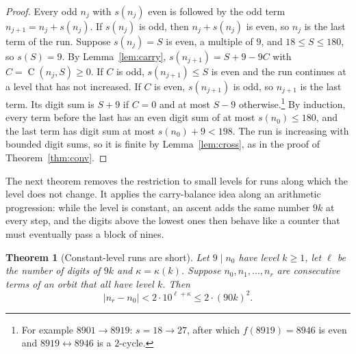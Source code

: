 \documentclass[11pt]{article}
\newtheorem{theorem}{Theorem}[section]
\theoremstyle{definition}
\theoremstyle{remark}
\newcommand{\C}{\operatorname{C}}
\begin{document}
\begin{proof}
Every odd $n_j$ with $s(n_j)$ even is followed by the odd term
$n_{j+1}=n_j+s(n_j)$. If $s(n_j)$ is odd, then $n_j+s(n_j)$ is even, so $n_j$
is the last term of the run. Suppose $s(n_j)=S$ is even, a multiple of $9$, and
$18\le S\le180$, so $s(S)=9$. By Lemma~\ref{lem:carry},
$s(n_{j+1})=S+9-9C$ with $C=\C(n_j,S)\ge0$. If $C$ is odd, $s(n_{j+1})\le S$
is even and the run continues at a level that has not increased. If $C$ is
even, $s(n_{j+1})$ is odd, so $n_{j+1}$ is the last term. Its digit sum is
$S+9$ if $C=0$ and at most $S-9$ otherwise.\footnote{For example $8901\to8919$:
$s=18\to27$, after which $f(8919)=8946$ is even and $8919\leftrightarrow8946$
is a $2$-cycle.} By induction, every term before the last has an even digit
sum of at most $s(n_0)\le180$, and the last term has digit sum at most
$s(n_0)+9<198$. The run is increasing with bounded digit sums, so it is finite
by Lemma~\ref{lem:cross}, as in the proof of Theorem~\ref{thm:conv}.
\end{proof}

The next theorem removes the restriction to small levels for runs along
which the level does not change. It applies the carry-balance idea along an
arithmetic progression: while the level is constant, an ascent adds the same
number $9k$ at every step, and the digits above the lowest ones then behave
like a counter that must eventually pass a block of nines.

\begin{theorem}[Constant-level runs are short]\label{thm:shortruns}
Let $9\mid n_0$ have level $k\ge1$, let $\ell$ be the number of digits of $9k$
and $\kappa=\kappa(k)$. Suppose $n_0,n_1,\dots,n_r$ are consecutive terms of an
orbit that all have level $k$. Then
\[
  |n_r-n_0|<2\cdot10^{\ell+\kappa}\le2\cdot(90k)^2 .
\]
\end{theorem}
\end{document}
